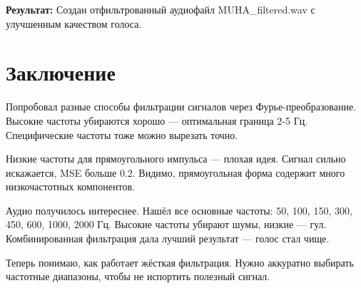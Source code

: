 \textbf{Результат:} Создан отфильтрованный аудиофайл MUHA\_filtered.wav с улучшенным качеством голоса.

\section*{Заключение}

Попробовал разные способы фильтрации сигналов через Фурье-преобразование. Высокие частоты убираются хорошо — оптимальная граница 2-5 Гц. Специфические частоты тоже можно вырезать точно.

Низкие частоты для прямоугольного импульса — плохая идея. Сигнал сильно искажается, MSE больше 0.2. Видимо, прямоугольная форма содержит много низкочастотных компонентов.

Аудио получилось интереснее. Нашёл все основные частоты: 50, 100, 150, 300, 450, 600, 1000, 2000 Гц. Высокие частоты убирают шумы, низкие — гул. Комбинированная фильтрация дала лучший результат — голос стал чище.

Теперь понимаю, как работает жёсткая фильтрация. Нужно аккуратно выбирать частотные диапазоны, чтобы не испортить полезный сигнал.
